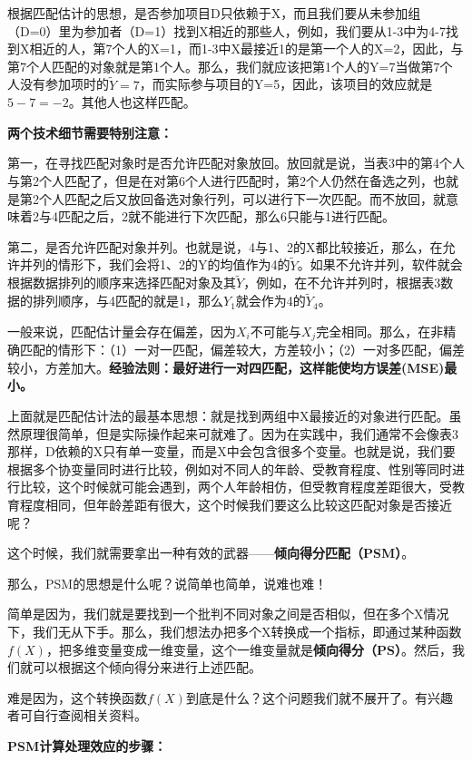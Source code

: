 \documentclass[cn,10pt,math=newtx,citestyle=gb7714-2015,bibstyle=gb7714-2015]{elegantbook}
\begin{document}
	根据匹配估计的思想，是否参加项目D只依赖于X，而且我们要从未参加组（D=0）里为参加者（D=1）找到X相近的那些人，例如，我们要从1-3中为4-7找到X相近的人，第7个人的X=1，而1-3中X最接近1的是第一个人的X=2，因此，与第7个人匹配的对象就是第1个人。那么，我们就应该把第1个人的Y=7当做第7个人没有参加项时的$\tilde{Y}=7$，而实际参与项目的Y=5，因此，该项目的效应就是$5-7=-2$。其他人也这样匹配。
	
	\textbf{两个技术细节需要特别注意：}
	
	第一，在寻找匹配对象时是否允许匹配对象放回。放回就是说，当表3中的第4个人与第2个人匹配了，但是在对第6个人进行匹配时，第2个人仍然在备选之列，也就是第2个人匹配之后又放回备选对象行列，可以进行下一次匹配。而不放回，就意味着2与4匹配之后，2就不能进行下次匹配，那么6只能与1进行匹配。
	
	第二，是否允许匹配对象并列。也就是说，4与1、2的X都比较接近，那么，在允许并列的情形下，我们会将1、2的Y的均值作为4的$\tilde{Y}$。如果不允许并列，软件就会根据数据排列的顺序来选择匹配对象及其$\tilde{Y}$，例如，在不允许并列时，根据表3数据的排列顺序，与4匹配的就是1，那么$Y_1$就会作为4的$\tilde{Y}_4$。
	
	一般来说，匹配估计量会存在偏差，因为$X_i$不可能与$X_j$完全相同。那么，在非精确匹配的情形下：（1）一对一匹配，偏差较大，方差较小；（2）一对多匹配，偏差较小，方差加大。\textbf{经验法则：最好进行一对四匹配，这样能使均方误差(MSE)最小。}
	
	上面就是匹配估计法的最基本思想：就是找到两组中X最接近的对象进行匹配。虽然原理很简单，但是实际操作起来可就难了。因为在实践中，我们通常不会像表3那样，D依赖的X只有单一变量，而是X中会包含很多个变量。也就是说，我们要根据多个协变量同时进行比较，例如对不同人的年龄、受教育程度、性别等同时进行比较，这个时候就可能会遇到，两个人年龄相仿，但受教育程度差距很大，受教育程度相同，但年龄差距有很大，这个时候我们要这么比较这匹配对象是否接近呢？
	
	这个时候，我们就需要拿出一种有效的武器——\textbf{倾向得分匹配（PSM）}。
	
	那么，PSM的思想是什么呢？说简单也简单，说难也难！
	
	简单是因为，我们就是要找到一个批判不同对象之间是否相似，但在多个X情况下，我们无从下手。那么，我们想法办把多个X转换成一个指标，即通过某种函数$f(X)$，把多维变量变成一维变量，这个一维变量就是\textbf{倾向得分（PS）}。然后，我们就可以根据这个倾向得分来进行上述匹配。
	
	难是因为，这个转换函数$f(X)$到底是什么？这个问题我们就不展开了。有兴趣者可自行查阅相关资料。
	
	\textbf{PSM计算处理效应的步骤：}
	
\end{document}
